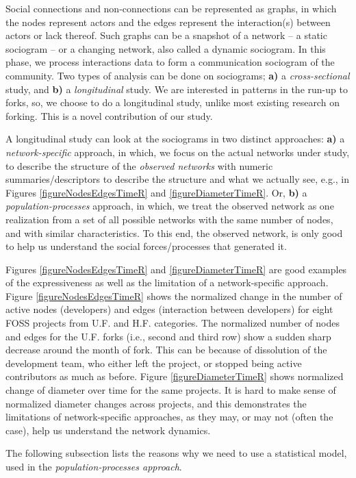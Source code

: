 \documentclass{report}
\begin{document}
Social connections and non-connections can be represented as graphs, in which the nodes represent actors and the edges represent the interaction(s) between actors or lack thereof. Such graphs can be a snapshot of a network -- a static sociogram -- or a changing network, also called a dynamic sociogram. In this phase, we process interactions data to form a communication sociogram of the community. Two types of analysis can be done on sociograms; \textbf{a)} a \textit{cross-sectional} study, and \textbf{b)} a \textit{longitudinal} study. We are interested in patterns in the run-up to forks, so, we choose to do a longitudinal study, unlike most existing research on forking. This is a novel contribution of our study.

A longitudinal study can look at the sociograms in two distinct approaches: \textbf{a)} a \textit{network-specific} approach, in which, we focus on the actual networks under study, to describe the structure of the \textit{observed networks} with numeric summaries/descriptors to describe the structure and what we actually see, e.g., in Figures \ref{figureNodesEdgesTimeR} and \ref{figureDiameterTimeR}. Or, \textbf{b)} a \textit{population-processes} approach, in which, we treat the observed network as one realization from a set of all possible networks with the same number of nodes, and with similar characteristics. To this end, the observed network, is only good to help us understand the social forces/processes that generated it.

Figures \ref{figureNodesEdgesTimeR} and \ref{figureDiameterTimeR} are good examples of the expressiveness as well as the limitation of a network-specific approach. Figure \ref{figureNodesEdgesTimeR} shows the normalized change in the number of active nodes (developers) and edges (interaction between developers) for eight FOSS projects from U.F. and H.F. categories. The normalized number of nodes and edges for the U.F. forks (i.e., second and third row) show a sudden sharp decrease around the month of fork. This can be because of dissolution of the development team, who either left the project, or stopped being active contributors as much as before. Figure  \ref{figureDiameterTimeR} shows normalized change of diameter over time for the same projects. It is hard to make sense of normalized diameter changes across projects, and this demonstrates the limitations of network-specific approaches, as they may, or may not (often the case), help us understand the network dynamics.

The following subsection lists the reasons why we need to use a statistical model, used in the \textit{population-processes approach}.
\end{document}

